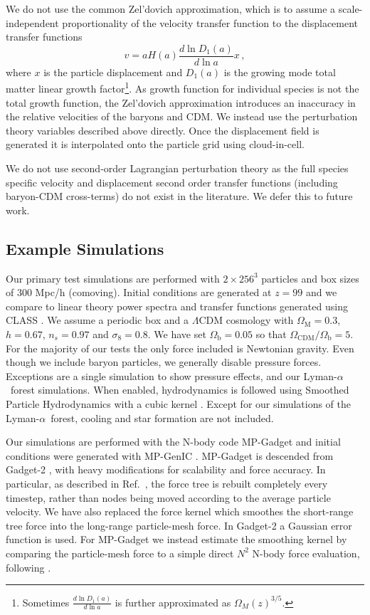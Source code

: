 \documentclass[a4paper,11pt]{article}
\newcommand{\Lya}{Lyman-$\alpha$}
\begin{document}
We do not use the common Zel'dovich approximation, which is to assume a scale-independent proportionality of the velocity transfer function to the displacement transfer functions
\begin{equation*}
 v = a H(a) \frac{d \ln D_1(a)}{d \ln a} x\,,
\end{equation*}
where $x$ is the particle displacement and $D_1(a)$ is the growing mode total matter linear growth factor\footnote{Sometimes $\frac{d \ln D_1(a)}{d \ln a}$ is further approximated as $\Omega_M(z)^{3/5}$.}. As growth function for individual species is not the total growth function, the Zel'dovich approximation introduces an inaccuracy in the relative velocities of the baryons and CDM. We instead use the perturbation theory variables described above directly. Once the displacement field is generated it is interpolated onto the particle grid using cloud-in-cell.

We do not use second-order Lagrangian perturbation theory \cite{Scoccimarro:1998} as the full species specific velocity and displacement second order transfer functions (including baryon-CDM cross-terms) do not exist in the literature. We defer this to future work.
\subsection{Example Simulations}
\label{sec:simulations}

Our primary test simulations are performed with $2\times 256^3$ particles and box sizes of $300$ Mpc/h (comoving). Initial conditions are generated at $z=99$ and we compare to linear theory power spectra and transfer functions generated using CLASS \cite{CLASS}. We assume a periodic box and a $\Lambda$CDM cosmology with $\Omega_\mathrm{M} = 0.3$, $h = 0.67$, $n_s = 0.97$ and $\sigma_8 = 0.8$. We have set $\Omega_\mathrm{b} = 0.05$ so that $\Omega_{\mathrm{CDM}}/ \Omega_\mathrm{b} = 5$. For the majority of our tests the only force included is Newtonian gravity. Even though we include baryon particles, we generally disable pressure forces. Exceptions are a single simulation to show pressure effects, and our \Lya~forest simulations. When enabled, hydrodynamics is followed using Smoothed Particle Hydrodynamics with a cubic kernel \cite{Springel:2005}. Except for our simulations of the \Lya~forest, cooling and star formation are not included.

Our simulations are performed with the N-body code MP-Gadget and initial conditions were generated with MP-GenIC \cite{yu_feng_2018_1451799}. MP-Gadget is descended from Gadget-2 \cite{Springel:2005}, with heavy modifications for scalability and force accuracy. In particular, as described in Ref.~\cite{Bird:2018}, the force tree is rebuilt completely every timestep, rather than nodes being moved according to the average particle velocity. We have also replaced the force kernel which smoothes the short-range tree force into the long-range particle-mesh force. In Gadget-2 a Gaussian error function is used. For MP-Gadget we instead estimate the smoothing kernel by comparing the particle-mesh force to a simple direct $N^2$ N-body force evaluation, following \cite{Heitmann:2010}.
\end{document}
